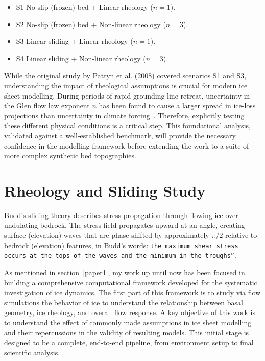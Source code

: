 \begin{itemize}
\item{S1} No-slip (frozen) bed + Linear rheology ($n=1$).
\item{S2} No-slip (frozen) bed + Non-linear rheology ($n=3$).
\item{S3} Linear sliding + Linear rheology ($n=1$).
\item{S4} Linear sliding + Non-linear rheology ($n=3$).
\end{itemize}

While the original study by Pattyn et al. (2008) covered scenarios S1 and S3, understanding the impact of rheological assumptions is crucial for modern ice sheet modelling. During periods of rapid grounding line retreat, uncertainty in the Glen flow law exponent $n$ has been found to cause a larger spread in ice-loss projections than uncertainty in climate forcing~\cite{Getraer_2025}. Therefore, explicitly testing these different physical conditions is a critical step. This foundational analysis, validated against a well-established benchmark, will provide the necessary confidence in the modelling framework before extending the work to a suite of more complex synthetic bed topographies.


\section{Rheology and Sliding Study}\label{study1}
Budd's sliding theory describes stress propagation through flowing ice over undulating bedrock. The stress field propagates upward at an angle, creating surface (elevation) waves that are phase-shifted by approximately $\pi/2$ relative to bedrock (elevation) features, in Budd's words: \texttt{\texttt{the maximum shear stress occurs at the tops of the waves and the minimum in the troughs''\cite{Budd_1970}}}. 

As mentioned in section~\ref{paper1}, my work up until now has been focused in building a comprehensive computational framework developed for the systematic investigation of ice dynamics. The first part of this framework is to study via flow simulations the behavior of ice to understand the relationship between basal geometry, ice rheology, and overall flow response. A key objective of this work is to understand the effect of commonly made assumptions in ice sheet modelling and their repercussions in the validity of resulting models. This initial stage is designed to be a complete, end-to-end pipeline, from environment setup to final scientific analysis. 

